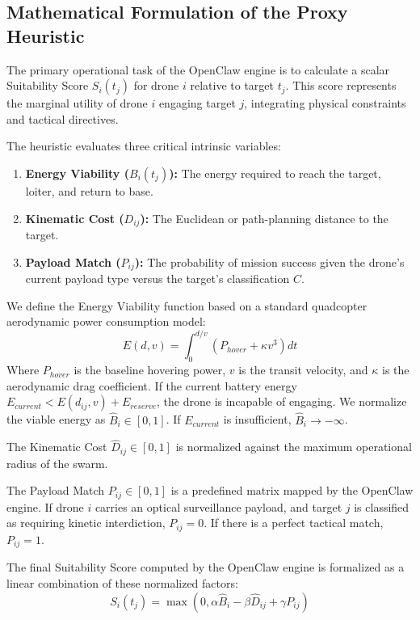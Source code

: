 \subsection{Mathematical Formulation of the Proxy Heuristic}
The primary operational task of the OpenClaw engine is to calculate a scalar Suitability Score $S_i(t_j)$ for drone $i$ relative to target $t_j$. This score represents the marginal utility of drone $i$ engaging target $j$, integrating physical constraints and tactical directives.

The heuristic evaluates three critical intrinsic variables:
\begin{enumerate}
    \item \textbf{Energy Viability ($B_i(t_j)$):} The energy required to reach the target, loiter, and return to base. 
    \item \textbf{Kinematic Cost ($D_{ij}$):} The Euclidean or path-planning distance to the target.
    \item \textbf{Payload Match ($P_{ij}$):} The probability of mission success given the drone's current payload type versus the target's classification $C$.
\end{enumerate}

We define the Energy Viability function based on a standard quadcopter aerodynamic power consumption model:
\begin{equation}
E(d, v) = \int_{0}^{d/v} \left( P_{hover} + \kappa v^3 \right) dt
\end{equation}
Where $P_{hover}$ is the baseline hovering power, $v$ is the transit velocity, and $\kappa$ is the aerodynamic drag coefficient. If the current battery energy $E_{current} < E(d_{ij}, v) + E_{reserve}$, the drone is incapable of engaging. We normalize the viable energy as $\hat{B}_i \in [0, 1]$. If $E_{current}$ is insufficient, $\hat{B}_i \rightarrow -\infty$.

The Kinematic Cost $\hat{D}_{ij} \in [0, 1]$ is normalized against the maximum operational radius of the swarm.

The Payload Match $P_{ij} \in [0, 1]$ is a predefined matrix mapped by the OpenClaw engine. If drone $i$ carries an optical surveillance payload, and target $j$ is classified as requiring kinetic interdiction, $P_{ij} = 0$. If there is a perfect tactical match, $P_{ij} = 1$.

The final Suitability Score computed by the OpenClaw engine is formalized as a linear combination of these normalized factors:
\begin{equation}
S_i(t_j) = \max \left(0, \alpha \hat{B}_i - \beta \hat{D}_{ij} + \gamma P_{ij} \right)
\label{eq:suitability}
\end{equation}

